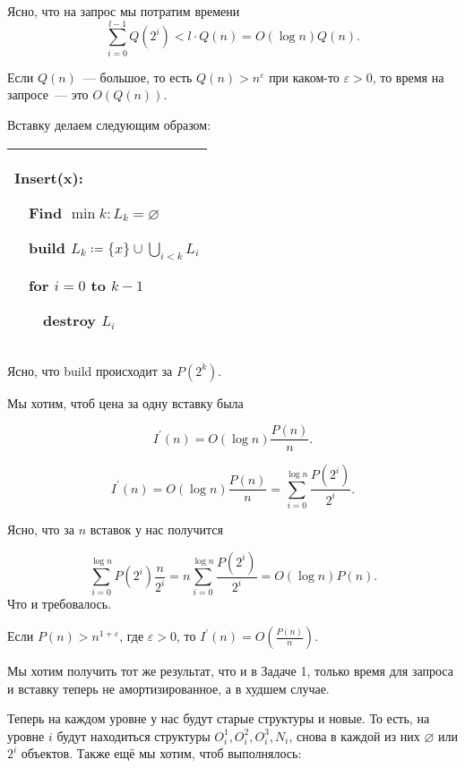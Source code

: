 Ясно, что на запрос мы потратим времени
\begin{equation*}
    \sum_{i=0}^{l-1}Q(2^i)<l\cdot Q(n)=O(\log n)Q(n).
\end{equation*}


\begin{remark}
    Если $Q(n)$~--- большое, то есть $Q(n)>n^\varepsilon$ при каком-то $\varepsilon >0$, то время на запросе~--- это $O(Q(n))$.
\end{remark}

Вставку делаем следующим образом:


\begin{tabular}{|p{5cm}|}
    \hline
    Insert(x):

    $\quad$Find $\min k: L_k=\varnothing$

    $\quad$build $L_k \coloneqq \{x\}\cup \bigcup_{i<k} L_i$

    $\quad$for $i=0$ to $k-1$

    $\quad$$\quad$destroy $L_i$ \\

    \hline
\end{tabular}

Ясно, что build происходит за $P\left(2^k\right)$.


Мы хотим, чтоб цена за одну вставку была

\begin{equation*}
    I^\prime(n)=O(\log n )\frac{P(n)}{n}.
\end{equation*}

\begin{equation*}
    I^\prime(n)=O(\log n )\frac{P(n)}{n}=\sum_{i=0}^{\log n}\frac{P(2^i)}{2^i}.
\end{equation*}

Ясно, что за $n$ вставок у нас получится

\begin{equation*}
    \sum_{i=0}^{\log n}P\left(2^i\right)\frac{n}{2^i} =n \sum_{i=0}^{\log n}\frac{P(2^i)}{2^i} = O(\log n)P(n).
\end{equation*}
Что и требовалось.


\begin{remark}
    Если $P(n)>n^{1+\varepsilon}$, где $\varepsilon>0$, то $I^\prime(n)=O\left(\frac{P(n)}{n}\right)$.
\end{remark}


\begin{task}
    Мы хотим получить тот же результат, что и в Задаче 1, только время для запроса и вставку теперь не амортизированное, а в худшем случае.
\end{task}
Теперь на каждом уровне у нас будут старые структуры и новые. То есть, на уровне $i$ будут находиться структуры $O_i^1,O_i^2,O_i^3,N_i$, снова в каждой из них $\varnothing$ или $2^i$ объектов. Также ещё мы хотим, чтоб выполнялось:

